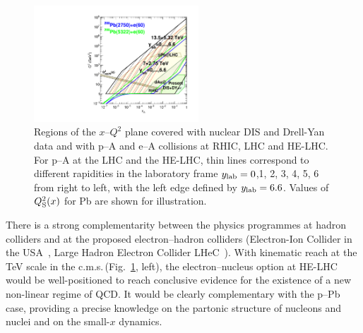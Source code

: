 \documentclass[../report.tex]{subfiles}
\begin{document}
\begin{figure}[t]
\centering
\includegraphics[width=0.55\textwidth]{helhc/figs/FHC8.pdf}
\caption{Regions of the $x$--$Q^2$ plane covered %
with nuclear DIS and Drell-Yan data and with p--A and e--A collisions at RHIC, LHC and HE-LHC.
For p--A  at the LHC and the HE-LHC, thin lines correspond to different rapidities in the
laboratory frame $y_{\rm lab} = 0$,1, 2, 3, 4, 5, 6 from right to left, with the left edge defined by $y_{\rm lab} = 6.6$. Values of $Q^2_{\rm S}(x)$ for Pb are shown for illustration.}
\label{fig:kinplane}
\end{figure}


There is a strong complementarity between the physics programmes at hadron colliders
and at the proposed electron--hadron colliders (Electron-Ion Collider in the USA~\cite{Accardi:2012qut}, Large Hadron Electron Collider LHeC~\cite{AbelleiraFernandez:2012cc}).
With kinematic reach at the TeV scale in the c.m.s.\,(Fig.~\ref{fig:kinplane}, left), 
the electron--nucleus option at HE-LHC would be well-positioned to reach conclusive evidence for the existence of a new non-linear regime of QCD. It would be clearly complementary with the p--Pb case, providing a precise knowledge on the partonic structure of nucleons and nuclei and on the small-$x$ dynamics. 



\end{document}
